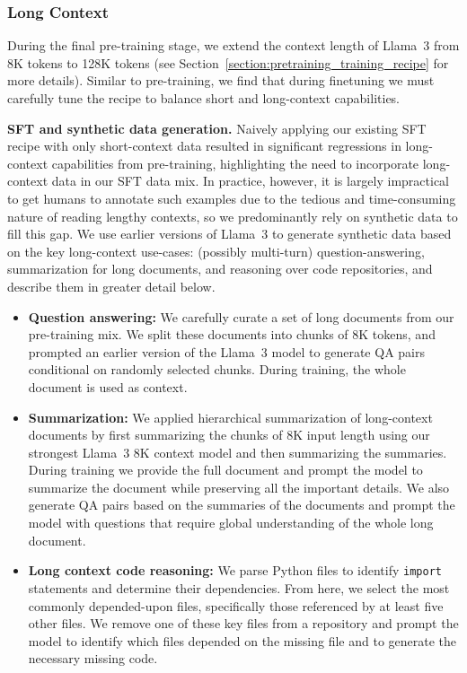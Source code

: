 \subsubsection{Long Context}
\label{subsubsec:long_context}

During the final pre-training stage, we extend the context length of Llama~3 from 8K tokens to 128K tokens (see Section~\ref{section:pretraining_training_recipe} for more details). Similar to pre-training, we find that during finetuning we must carefully tune the recipe to balance short and long-context capabilities.

\textbf{SFT and synthetic data generation.} Naively applying our existing SFT recipe with only short-context data resulted in significant regressions in long-context capabilities from pre-training, highlighting the need to incorporate long-context data in our SFT data mix. In practice, however, it is largely impractical to get humans to annotate such examples due to the tedious and time-consuming nature of reading lengthy contexts, so we predominantly rely on synthetic data to fill this gap. We use earlier versions of Llama~3 to generate synthetic data based on the key long-context use-cases: (possibly multi-turn) question-answering, summarization for long documents, and reasoning over code repositories, and describe them in greater detail below.

\begin{itemize}
    \item \textbf{Question answering:} We carefully curate a set of long documents from our pre-training mix. We split these documents into chunks of 8K tokens, and prompted an earlier version of the Llama~3 model to generate QA pairs conditional on randomly selected chunks. During training, the whole document is used as context.

    \item \textbf{Summarization:} We applied hierarchical summarization of long-context documents by first summarizing the chunks of 8K input length using our strongest Llama~3 8K context model and then summarizing the summaries. During training we provide the full document and prompt the model to summarize the document while preserving all the important details. We also generate QA pairs based on the summaries of the documents and prompt the model with questions that require global understanding of the whole long document.

    \item \textbf{Long context code reasoning:} We parse Python files to identify \texttt{import} statements and determine their dependencies. From here, we select the most commonly depended-upon files, specifically those referenced by at least five other files. We remove one of these key files from a repository and prompt the model to identify which files depended on the missing file and to generate the necessary missing code.
\end{itemize}

